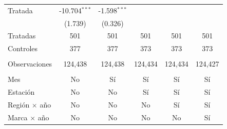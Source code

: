\begin{tabular}{lccccc}
   Tratada              & -10.704$^{***}$ & -1.598$^{***}$ &                &                &   \\   
                        & (1.739)         & (0.326)        &                &                &   \\   
   Tratadas             & 501             & 501            & 501            & 501            & 501\\  
   Controles            & 377             & 377            & 373            & 373            & 373\\  
    \\
   Observaciones        & 124,438         & 124,438        & 124,434        & 124,434        & 124,427\\  
    \\
   Mes                  & No              & Sí             & Sí             & Sí             & Sí\\  
   Estación             & No              & No             & Sí             & Sí             & Sí\\  
   Región $\times$ año  & No              & No             & No             & Sí             & Sí\\  
   Marca $\times$ año   & No              & No             & No             & No             & Sí\\  
   \bottomrule
\end{tabular}
\par\endgroup


